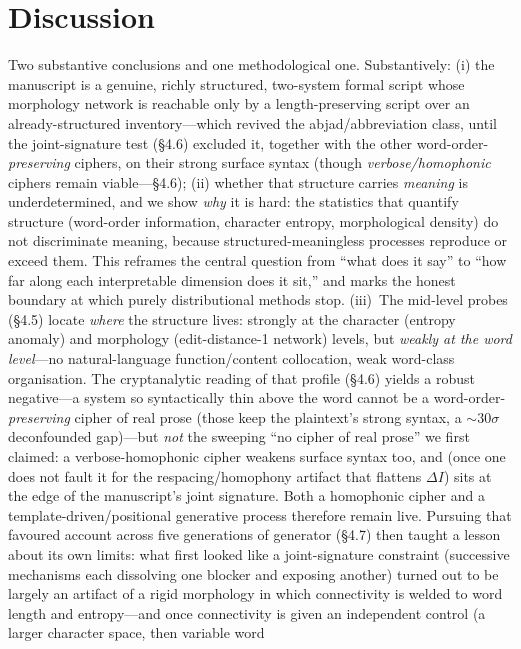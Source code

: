 \documentclass[11pt]{article}
\begin{document}
\section{Discussion}
Two substantive conclusions and one methodological one. Substantively: (i) the
manuscript is a genuine, richly structured, two-system formal script whose morphology
network is reachable only by a length-preserving script over an already-structured
inventory---which revived the abjad/abbreviation class, until the joint-signature test
(\S4.6) excluded it, together with the other word-order-\emph{preserving} ciphers, on their
strong surface syntax (though \emph{verbose/homophonic} ciphers remain viable---\S4.6); (ii) whether that structure carries
\emph{meaning} is underdetermined, and we show \emph{why} it is hard: the statistics
that quantify structure (word-order information, character entropy, morphological
density) do not discriminate meaning, because structured-meaningless processes reproduce
or exceed them. This reframes the central question from ``what does it say'' to ``how far
along each interpretable dimension does it sit,'' and marks the honest boundary at which
purely distributional methods stop. (iii)~The mid-level probes (\S4.5) locate
\emph{where} the structure lives: strongly at the character (entropy anomaly) and
morphology (edit-distance-1 network) levels, but \emph{weakly at the word level}---no
natural-language function/content collocation, weak word-class organisation. The
cryptanalytic reading of that profile (\S4.6) yields a robust negative---a system so
syntactically thin above the word cannot be a word-order-\emph{preserving} cipher of real
prose (those keep the plaintext's strong syntax, a $\sim\!30\sigma$ deconfounded gap)---but
\emph{not} the sweeping ``no cipher of real prose'' we first claimed: a verbose-homophonic
cipher weakens surface syntax too, and (once one does not fault it for the
respacing/homophony artifact that flattens $\Delta I$) sits at the edge of the manuscript's
joint signature. Both a homophonic cipher and a template-driven/positional generative process
therefore remain live. Pursuing that
favoured account across five generations of generator (\S4.7) then taught a lesson about
its own limits: what first looked like a joint-signature constraint (successive mechanisms
each dissolving one blocker and exposing another) turned out to be largely an artifact of a
rigid morphology in which connectivity is welded to word length and entropy---and once
connectivity is given an independent control (a larger character space, then variable word
\end{document}
